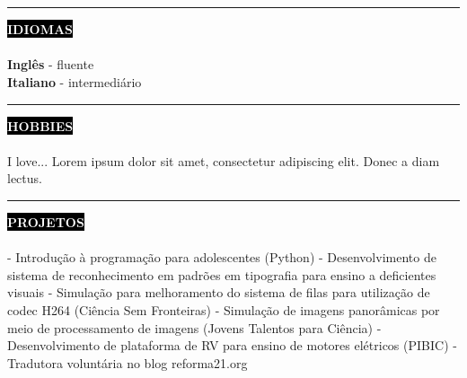 \documentclass[10pt,A4]{article}
\newcounter{a}
\newcounter{b}
\newcounter{c}
\newcommand{\cvsection}[1] {
	\textcolor{white}{\MakeUppercase{\textbf{#1}}}
}
\newcommand{\cvsect}[1]{
	\colorbox{black}{{\cvsection{#1}}}\\\\%
}
\newcommand{\lorem}{Lorem ipsum dolor sit amet, consectetur adipiscing elit. Donec a diam lectus.}
\begin{document}
	\\\\
	\begin{minipage}[t]{0.3\textwidth}\hrule height 0pt width 0pt%
		\cvsect{Idiomas}
		\textbf{Inglês} - fluente\\
		\textbf{Italiano} - intermediário
	\end{minipage}%
	\hspace{0cm}
	\begin{minipage}[t]{0.3\textwidth}\hrule height 0pt width 0pt%
		\cvsect{Hobbies}
		I love... \lorem
	\end{minipage}%
	\hspace{2cm}
	\begin{minipage}[t]{0.3\textwidth}\hrule height 0pt width 0pt%
		\cvsect{Projetos}
		- Introdução à programação para adolescentes (Python)
		- Desenvolvimento de sistema de reconhecimento em padrões em tipografia para ensino a deficientes visuais
		- Simulação para melhoramento do sistema de filas para utilização de codec H264 (Ciência Sem Fronteiras)
		- Simulação de imagens panorâmicas por meio de processamento de imagens (Jovens Talentos para Ciência)
		- Desenvolvimento de plataforma de RV para ensino de motores elétricos (PIBIC)
		- Tradutora voluntária no blog reforma21.org
	\end{minipage}%
\end{document}
